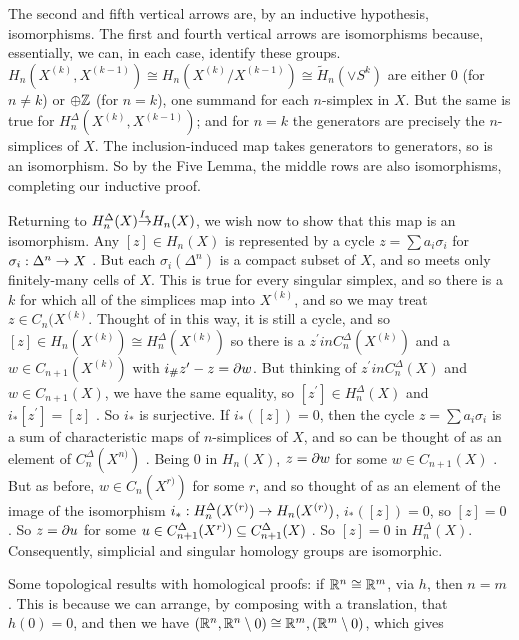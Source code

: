 The second and fifth vertical arrows are, by an inductive hypothesis, isomorphisms. The first and fourth vertical arrows are
isomorphisms because, essentially, we can, in each case, identify these groups. 
$H_{n}(X^{(k)},X^{(k-1)})\cong H_{n}(X^{(k)}/X^{(k-1)})\cong \widetilde{H}_n(\vee S^k)$
are either 0 (for $n\neq k$) or $\oplus {\Bbb Z}$ (for $n=k$), one summand for each $n$-simplex in $X$. 
But the same is true for $H_{n}^\Delta(X^{(k)},X^{(k-1)})$; and for $n=k$ the generators are precisely
the $n$-simplices of $X$. The inclusion-induced map takes generators to generators, so is an isomorphism.
\hhsk So by the Five Lemma, the middle rows are also isomorphisms, completing our inductive proof.

\ssk

Returning to $H_n^\Delta(X) {\buildrel {I_*}\over \ra} H_n(X)$, we wish now to show that this map is an isomorphism.
Any $[z]\in H_n(X)$ is represented by a cycle $z=\sum a_i\sigma_i$ for $\sigma_i:\Delta^n\rightarrow X$ . But each
$\sigma_i(\Delta^n)$ is a compact subset of $X$, and so meets only finitely-many cells of $X$. This is true for every
singular simplex, and so there is a $k$ for which all of the simplices map into $X^{(k)}$, and so we may
treat $z\in C_n(X^{(k)}$. Thought of in this way, it is still a cycle, and so $[z]\in H_n(X^{(k)})\cong H_n^\Delta(X^{(k)})$
so there is a $z^\prime in C_n^\Delta(X^{(k)})$ and a $w\in C_{n+1}(X^{(k)})$ with $i_\#z^\prime -z=\partial w$. 
But thinking of  $z^\prime in C_n^\Delta(X)$ and $w\in C_{n+1}(X)$, we have the same equality, so 
$[z^\prime] \in H_n^\Delta(X)$ and $i_*[z^\prime] = [z]$ . So $i_*$ is surjective.
If $i_*([z]) = 0$, then the cycle $z=\sum a_i\sigma_i$ is a sum of characteristic maps of $n$-simplices of $X$, and
so can be thought of as an element of $C_n^\Delta(X^{n)})$ . Being $0$ in $H_n(X)$, $z=\partial w$ for some
$w\in C_{n+1}(X)$ . But as before, $w\in C_n(X^{r)})$ for some $r$, and so thought of as an element of 
the image of the isomorphism $i_*: H_n^\Delta(X^{(r)})\rightarrow H_n(X^{(r)})$, $i_*([z])=0$, so $[z]=0$ . So 
$z=\partial u$ for some $u\in C_{n+1}^\Delta(X^{r)})\subseteq C_{n+1}^\Delta(X)$ . So $[z]=0$ in $H_n^\Delta(X)$.
Consequently, simplicial and singular homology groups are isomorphic.




\bigskip

Some topological results with homological proofs: if ${\Bbb R}^n\cong {\Bbb R}^m$, via $h$, then $n=m$ .
This is because we can arrange, by composing with a translation, that $h(0)=0$, and then 
we have 
$({\Bbb R}^n,{\Bbb R}^n\setminus 0)\cong {\Bbb R}^m,({\Bbb R}^m\setminus 0)$, which gives



